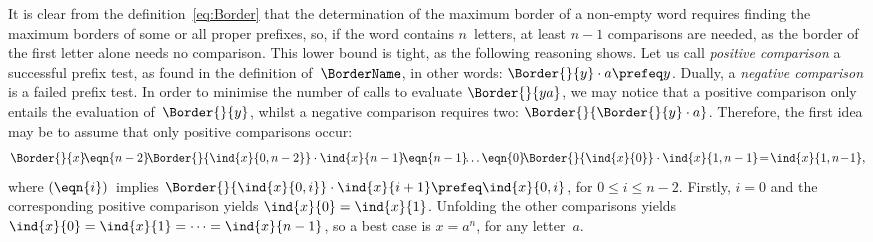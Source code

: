 It is clear from the definition~\eqref{eq:Border} 
that the determination of the maximum border of a non\hyp{}empty word
requires finding the maximum borders of some or all proper prefixes,
so, if the word contains \(n\)~letters, at least \(n-1\) comparisons
are needed, as the border of the first letter alone needs no
comparison. This lower bound is tight, as the following reasoning
shows. Let us call \emph{positive comparison} a successful prefix test, as
found in the definition of~\(\BorderName\), in other words:
\(\Border{}{y} \cdot a \prefeq y\). Dually, a \emph{negative
comparison} is a
failed prefix test. In order to minimise the number of calls to
evaluate \(\Border{}{ya}\), we may notice that a positive comparison
only entails the evaluation of~\(\Border{}{y}\), whilst a negative
comparison requires two: \(\Border{}{\Border{}{y} \cdot
  a}\). Therefore, the first idea may be to assume that only positive
comparisons occur:
\begin{equation*}
\Border{}{x} \!\eqn{n-2}\!
\Border{}{\ind{x}{0,n-2}} \cdot \ind{x}{n-1}
\!\eqn{n-1}\!\! \dots
\eqn{0}\! \Border{}{\ind{x}{0}} \cdot \ind{x}{1,n-1}
\!=\! \ind{x}{1,n\!-\!1},
\end{equation*}
where \((\smash{\eqn{i}})\)~implies \(\Border{}{\ind{x}{0,i}} \cdot
\ind{x}{i+1} \prefeq \ind{x}{0,i}\), for \(0 \leqslant i \leqslant
n-2\). Firstly, \(i=0\) and the corresponding positive comparison
yields \(\ind{x}{0} = \ind{x}{1}\). Unfolding the other comparisons
yields \(\ind{x}{0} = \ind{x}{1} = \dots = \ind{x}{n-1}\), so a best
case is \(x=a^n\), for any letter~\(a\).

